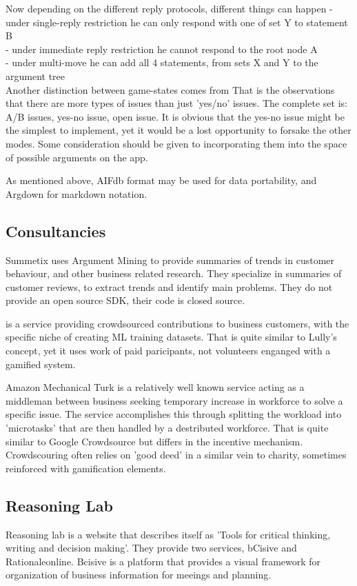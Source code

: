 \documentclass{report}
\begin{document}
{Now depending on the different reply protocols, different things can happen
- under single-reply restriction he can only respond with one of set Y to statement B \\
- under immediate reply restriction he cannot respond to the root node A \\
- under multi-move he can add all 4 statements, from sets X and Y to the argument tree \\

Another distinction between game-states comes from \cite{wyner_argument_2015}
That is the observations that there are more types of issues than just 'yes/no' issues.
The complete set is: A/B issues, yes-no issue, open issue.
It is obvious that the yes-no issue might be the simplest to implement, yet it would be a lost opportunity to forsake the other modes.
Some consideration should be given to incorporating them into the space of possible arguments on the app.

As mentioned above, AIFdb format may be used for data portability, and Argdown for markdown notation.


\subsection{Consultancies}
Summetix \cite{schiller_stance_2021} uses Argument Mining to provide summaries of trends in customer behaviour, and other business related research. They specialize in summaries of customer reviews, to extract trends and identify main problems. They do not provide an open source SDK, their code is closed source.

\cite{noauthor_crowdee_nodate} is a service providing crowdsourced contributions to business customers, with the specific niche of creating ML training datasets. That is quite similar to Lully's concept, yet it uses work of paid paricipants, not volunteers enganged with a gamified system.

Amazon Mechanical Turk \cite{noauthor_amazon_nodate} is a relatively well known service acting as a middleman between business seeking temporary increase in workforce to solve a specific issue.
The service accomplishes this through splitting the workload into 'microtasks' that are then handled by a destributed workforce. That is quite similar to Google Crowdsource but differs in the incentive mechanism. Crowdscouring often relies on 'good deed' in a similar vein to charity, sometimes reinforced with gamification elements.

\subsection{Reasoning Lab}
Reasoning lab \cite{noauthor_argument_nodate} is a website that describes itself as 'Tools for critical thinking, writing and decision making'. They provide two services, bCisive and Rationaleonline.
Bcisive \cite{noauthor_bcisive_nodate} is a platform that provides a visual framework for organization of business information for meeings and planning.

}
\end{document}

